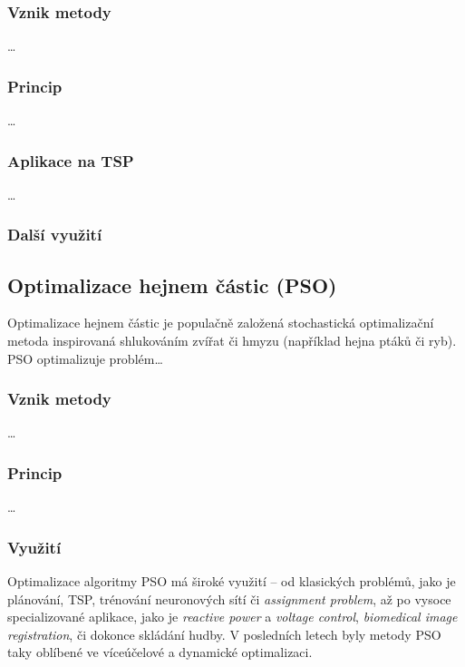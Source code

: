 \documentclass[a4paper,12pt]{article}
\begin{document}
\subsubsection{Vznik metody}
\dots

\subsubsection{Princip}
\dots

\subsubsection{Aplikace na TSP}
\dots

\subsubsection{Další využití}




\subsection{Optimalizace hejnem částic (PSO)}
Optimalizace hejnem částic je populačně založená stochastická optimalizační metoda inspirovaná
shlukováním zvířat či hmyzu (například hejna ptáků či ryb). PSO optimalizuje problém\dots


\subsubsection{Vznik metody}
\dots

\subsubsection{Princip}
\dots

\subsubsection{Využití}
Optimalizace algoritmy PSO má široké využití -- od klasických problémů, jako je plánování, TSP,
trénování neuronových sítí či {\it assignment problem}, až po vysoce
specializované aplikace, jako je {\it reactive power} a {\it voltage control}, {\it biomedical image registration},
či dokonce skládání hudby. V posledních letech byly metody PSO taky oblíbené ve víceúčelové a dynamické optimalizaci.
\end{document}
